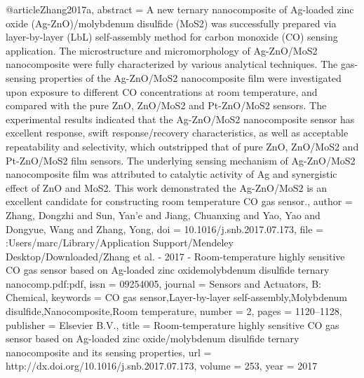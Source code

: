 @article{Zhang2017a,
abstract = {A new ternary nanocomposite of Ag-loaded zinc oxide (Ag-ZnO)/molybdenum disulfide (MoS2) was successfully prepared via layer-by-layer (LbL) self-assembly method for carbon monoxide (CO) sensing application. The microstructure and micromorphology of Ag-ZnO/MoS2 nanocomposite were fully characterized by various analytical techniques. The gas-sensing properties of the Ag-ZnO/MoS2 nanocomposite film were investigated upon exposure to different CO concentrations at room temperature, and compared with the pure ZnO, ZnO/MoS2 and Pt-ZnO/MoS2 sensors. The experimental results indicated that the Ag-ZnO/MoS2 nanocomposite sensor has excellent response, swift response/recovery characteristics, as well as acceptable repeatability and selectivity, which outstripped that of pure ZnO, ZnO/MoS2 and Pt-ZnO/MoS2 film sensors. The underlying sensing mechanism of Ag-ZnO/MoS2 nanocomposite film was attributed to catalytic activity of Ag and synergistic effect of ZnO and MoS2. This work demonstrated the Ag-ZnO/MoS2 is an excellent candidate for constructing room temperature CO gas sensor.},
author = {Zhang, Dongzhi and Sun, Yan'e and Jiang, Chuanxing and Yao, Yao and Dongyue, Wang and Zhang, Yong},
doi = {10.1016/j.snb.2017.07.173},
file = {:Users/marc/Library/Application Support/Mendeley Desktop/Downloaded/Zhang et al. - 2017 - Room-temperature highly sensitive CO gas sensor based on Ag-loaded zinc oxidemolybdenum disulfide ternary nanocomp.pdf:pdf},
issn = {09254005},
journal = {Sensors and Actuators, B: Chemical},
keywords = {CO gas sensor,Layer-by-layer self-assembly,Molybdenum disulfide,Nanocomposite,Room temperature},
number = {2},
pages = {1120--1128},
publisher = {Elsevier B.V.},
title = {{Room-temperature highly sensitive CO gas sensor based on Ag-loaded zinc oxide/molybdenum disulfide ternary nanocomposite and its sensing properties}},
url = {http://dx.doi.org/10.1016/j.snb.2017.07.173},
volume = {253},
year = {2017}
}

